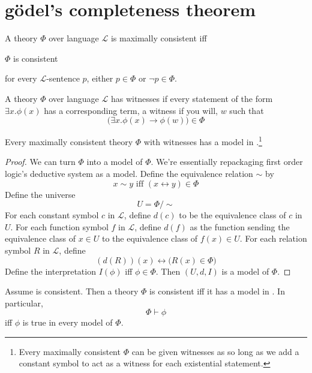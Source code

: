 \documentclass{scrbook}
\renewcommand{\implies}{\to}
\renewcommand{\iff}{\leftrightarrow}
\begin{document}
\section[Gödel's completeness theorem]{gödel's completeness theorem}
\begin{defn}
  A theory $\Phi$ over language $\mathcal L$ is maximally consistent iff
  \begin{trivlist}
  \item $\Phi$ is consistent
  \item for every $\mathcal L$-sentence $p$, either $p\in \Phi$ or
    $\neg p \in \Phi$.
  \end{trivlist}
\end{defn}
\begin{defn}[witnesses]
  A theory $\Phi$ over language $\mathcal L$ has witnesses if every statement of the form $\exists x. \phi (x)$ has a corresponding term, a witness if you will, $w$ such that
  \[
  \bigl(\exists x.\phi(x) \implies \phi(w)\bigr) \in  \Phi
  \]
\end{defn}
\begin{theorem}
  Every maximally consistent theory $\Phi$ with witnesses has a model in \zfc.\footnote{Every maximally consistent $\Phi$ can be given witnesses as so long as we add a constant symbol to act as a witness for each existential statement.}
\end{theorem}
\begin{proof}
  We can turn $\Phi$ into a model of $\Phi$. We're essentially repackaging first order logic's deductive system as a model. Define the equivalence relation $\sim$ by 
  \[
  x\sim y \textrm{ iff }(x\iff y) \in \Phi
  \]
  Define the universe
  \[
  U=\Phi/\sim
  \]
  For each constant symbol $c$ in $\mathcal L$, define $d(c)$ to be the equivalence class of $c$ in $U$. 
  For each function symbol $f$ in $\mathcal L$, define $d(f)$ as the function sending the equivalence class of $x\in U$ to the equivalence class of $f(x)\in U$. For each relation symbol $R$ in $\mathcal L$, define
  \[
  (d(R))(x) \iff \bigl(R(x)\in \Phi\bigr)
  \]
  Define the interpretation $I(\phi)$ iff $\phi\in \Phi$. 
  Then $(U,d,I)$ is a model of $\Phi$. 
\end{proof}
\begin{cor}\label{th:compactness}
  Assume \zfc is consistent. Then a theory $\Phi$ is consistent iff it has a model in \zfc. In particular,
  \[
  \Phi \vdash \phi
  \]
  iff $\phi$ is true in every model of $\Phi$.  
\end{cor}
\end{document}
